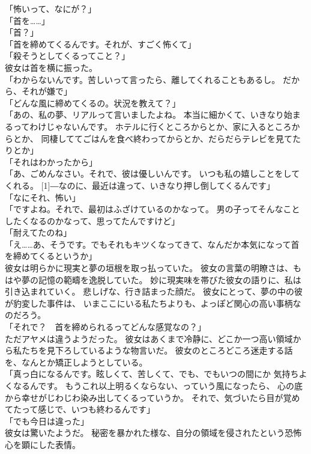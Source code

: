 \documentclass[../IHMain]{subfiles}
\begin{document}
「怖いって、なにが？」\\
「首を……」\\
「首？」\\
「首を締めてくるんです。それが、すごく怖くて」\\
「殺そうとしてくるってこと？」\\
彼女は首を横に振った。\\
「わからないんです。苦しいって言ったら、離してくれることもあるし。
だから、それが嫌で」\\
「どんな風に締めてくるの。状況を教えて？」\\
「あの、私の夢、リアルって言いましたよね。
本当に細かくて、いきなり始まるってわけじゃないんです。
ホテルに行くところからとか、家に入るところからとか、
同棲しててごはんを食べ終わってからとか、だらだらテレビを見てたりとか」\\
「それはわかったから」\\
「あ、ごめんなさい。それで、彼は優しいんです。
いつも私の嬉しことをしてくれる。
\scalebox{3}[1]{―}なのに、最近は違って、いきなり押し倒してくるんです」\\
「なにそれ、怖い」\\
「ですよね。それで、最初はふざけているのかなって。
男の子ってそんなことしたくなるのかなって、思ってたんですけど」\\
「耐えてたのね」\\
「え……あ、そうです。でもそれもキツくなってきて、なんだか本気になって首を締めてくるというか」\\
彼女は明らかに現実と夢の垣根を取っ払っていた。
彼女の言葉の明瞭さは、もはや夢の記憶の範疇を逸脱していた。
妙に現実味を帯びた彼女の語りに、私は引き込まれていく。
悲しげな、行き詰まった顔だ。
彼女にとって、夢の中の彼が豹変した事件は、
いまここにいる私たちよりも、よっぽど関心の高い事柄なのだろう。\\
「それで？　首を締められるってどんな感覚なの？」\\
ただアヤメは違うようだった。
彼女はあくまで冷静に、どこか一つ高い領域から私たちを見下ろしているような物言いだ。
彼女のところどころ迷走する話を、なんとか矯正しようとしている。\\
「真っ白になるんです。眩しくて、苦しくて、でも、でもいつの間にか
気持ちよくなるんです。
もうこれ以上明るくならない、っていう風になったら、
心の底から幸せがじわじわ染み出してくるっていうか。
それで、気づいたら目が覚めてたって感じで、いつも終わるんです」\\
「でも今日は違った」\\
彼女は驚いたようだ。
秘密を暴かれた様な、自分の領域を侵されたという恐怖心を顕にした表情。\\
\end{document}

